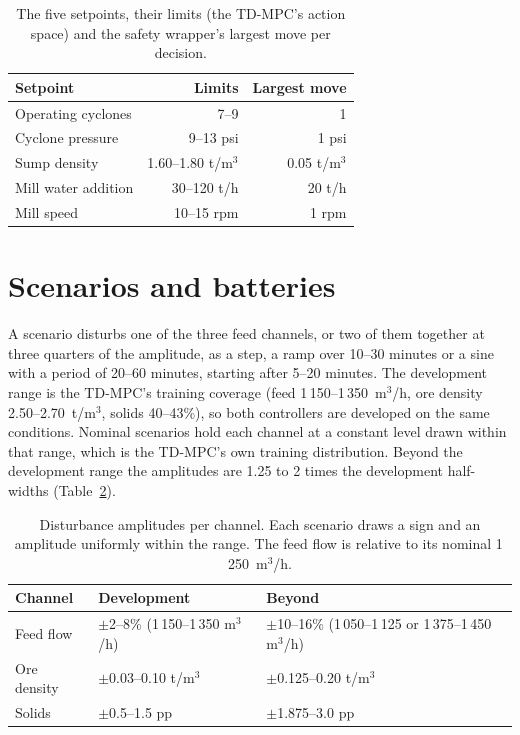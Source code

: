 \begin{table}[tb]
  \centering
  \caption{The five setpoints, their limits (the TD-MPC's action space) and the
    safety wrapper's largest move per decision.}
  \label{tab:mill-setpoints}
  \begin{tabular}{@{}lrr@{}}
    \toprule
    Setpoint & Limits & Largest move \\
    \midrule
    Operating cyclones          & 7--9           & 1 \\
    Cyclone pressure            & 9--13 psi      & 1 psi \\
    Sump density                & 1.60--1.80 t/m$^3$ & 0.05 t/m$^3$ \\
    Mill water addition         & 30--120 t/h    & 20 t/h \\
    Mill speed                  & 10--15 rpm     & 1 rpm \\
    \bottomrule
  \end{tabular}
\end{table}

\section{Scenarios and batteries}
\label{sec:mill-scenarios}
A scenario disturbs one of the three feed channels, or two of them together at
three quarters of the amplitude, as a step, a ramp over 10--30 minutes or a
sine with a period of 20--60 minutes, starting after 5--20 minutes. The
development range is the TD-MPC's training coverage (feed 1\,150--1\,350~m$^3$/h,
ore density 2.50--2.70~t/m$^3$, solids 40--43\%), so both controllers are
developed on the same conditions. Nominal scenarios hold each channel at a
constant level drawn within that range, which is the TD-MPC's own training
distribution. Beyond the development range the amplitudes are 1.25 to 2 times
the development half-widths (Table~\ref{tab:mill-ranges}).

\begin{table}[tb]
  \centering
  \caption{Disturbance amplitudes per channel. Each scenario draws a sign and
    an amplitude uniformly within the range. The feed flow is relative to its
    nominal 1\,250~m$^3$/h.}
  \label{tab:mill-ranges}
  \small
  \begin{tabular}{@{}lp{}p{}@{}}
    \toprule
    Channel & Development & Beyond \\
    \midrule
    Feed flow   & $\pm$2--8\% (1\,150--1\,350 m$^3$/h) & $\pm$10--16\% (1\,050--1\,125 or 1\,375--1\,450 m$^3$/h) \\
    Ore density & $\pm$0.03--0.10 t/m$^3$ & $\pm$0.125--0.20 t/m$^3$ \\
    Solids      & $\pm$0.5--1.5 pp        & $\pm$1.875--3.0 pp \\
    \bottomrule
  \end{tabular}
\end{table}

